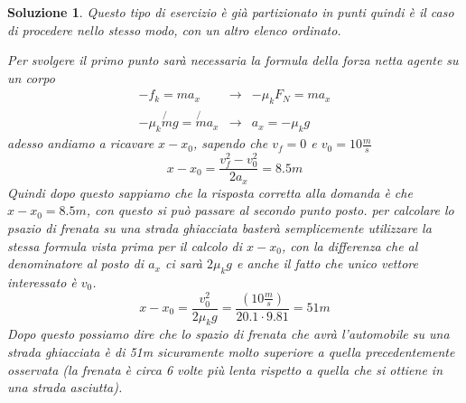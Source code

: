 \documentclass{article}
\newtheorem{sol}{Soluzione}[section]
\begin{document}
\begin{sol}
  Questo tipo di esercizio è già partizionato in punti quindi è il caso di procedere nello stesso modo, con un altro elenco ordinato.
  \begin{tasks}
    \task Per svolgere il primo punto sarà necessaria la formula della forza netta agente su un corpo
    \begin{equation*}
      \begin{matrix}
        -f_k=ma_x &\to& -\mu_kF_N=ma_x\\
        -\mu_k\not{m}g=\not{m}a_x&\to& a_x=-\mu_kg
      \end{matrix}
    \end{equation*}
    adesso andiamo a ricavare $x-x_0$, sapendo che $v_f=0$ e $v_0=10\frac{m}{s}$
    \begin{equation*}
      x-x_0=\frac{v_f^2-v_0^2}{2a_x}=8.5m
    \end{equation*}
    Quindi dopo questo sappiamo che la risposta corretta alla domanda è che $x-x_0=8.5m$, con questo si può passare al secondo punto posto.
    \task per calcolare lo psazio di frenata su una strada ghiacciata basterà semplicemente utilizzare la stessa formula vista prima per il calcolo di $x-x_0$, con la differenza che al denominatore al posto di $a_x$ ci sarà $2\mu_kg$ e anche il fatto che unico vettore interessato è $v_0$.
    \begin{equation*}
      x-x_0=\frac{v_0^2}{2\mu_kg}=\frac{\left(10\frac{m}{s}\right)}{20.1\cdot 9.81}=51m
    \end{equation*}
    Dopo questo possiamo dire che lo spazio di frenata che avrà l'automobile su una strada ghiacciata è di 51m sicuramente molto superiore a quella precedentemente osservata (la frenata è circa 6 volte più lenta rispetto a quella che si ottiene in una strada asciutta).
  \end{tasks}
\end{sol}
\end{document}
